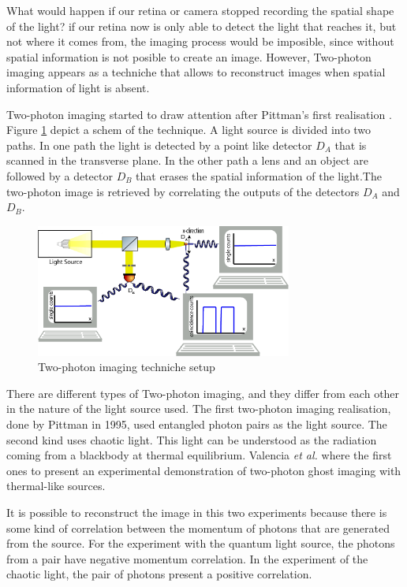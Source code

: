 What would happen if our retina or camera stopped recording the spatial shape of the light? if our retina now is 
only able to detect the light that reaches it, but not where it comes from, 
the imaging process would be imposible, since without spatial information is not posible to create an image.
However, Two-photon imaging appears as a techniche that allows to reconstruct images when spatial information of light is absent. 

Two-photon imaging started to draw attention after Pittman's first realisation \cite{pittman}. Figure \ref{fig:twoPh} depict a schem of the technique.
 A light source is divided into two paths. In one path the light is detected by a point like detector $D_A$
that is scanned in the transverse plane. In the other path a lens and an object are followed by a detector $D_B$ that erases the spatial information
 of the light.The two-photon image is retrieved by correlating the outputs of the detectors $D_A$ and $D_B$. 





\begin{figure}[h]
\centering
\includegraphics[width=0.75\textwidth]{Figures/twoPhotonSetup.png}
\caption{Two-photon imaging techniche setup} 
\label{fig:twoPh}
\end{figure}

There are different types of Two-photon imaging, and they differ from each other in the nature of the light 
source used. The first two-photon imaging realisation, done by Pittman in 1995\cite{pittman}, 
used entangled photon pairs as the light source. The second kind uses chaotic light. 
This light can be understood as the radiation coming from a blackbody at thermal equilibrium. 
Valencia \textit{et al.} where the first ones to present an experimental demonstration 
of two-photon ghost imaging with thermal-like sources\cite{thermalAlejandra}.

It is possible to reconstruct the image in this two experiments because there is some kind of 
correlation between the momentum of photons that are generated from the source. For the experiment with the quantum light source, the photons from a pair have negative momentum correlation.
In the experiment of the chaotic light, the pair of photons present a positive correlation\cite{positiveCorre}. 

